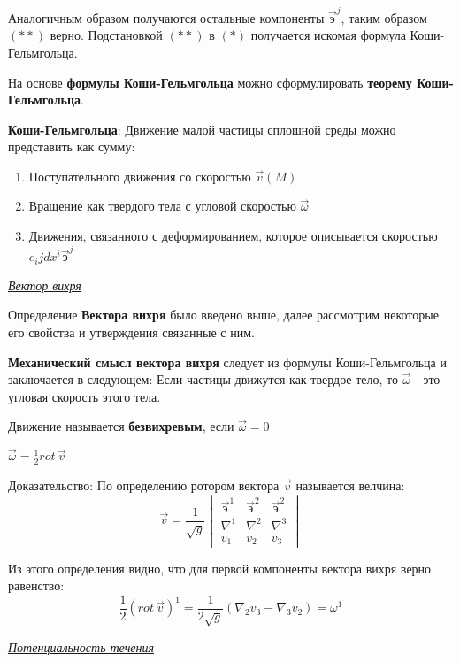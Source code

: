 Аналогичным образом получаются остальные компоненты $\vec{\text{э}}^j$, таким образом $(**)$ верно. Подстановкой $(**)$ в $(*)$ получается искомая формула Коши-Гельмгольца.

На основе \textbf{формулы Коши-Гельмгольца} можно сформулировать \textbf{теорему Коши-Гельмгольца}.

\theorem \textbf{Коши-Гельмгольца}: Движение малой частицы сплошной среды можно представить как сумму:
\begin{enumerate}
	\item Поступательного движения со скоростью $\vec{v}(M)$
	\item Вращение как твердого тела с угловой скоростью $\vec{\omega}$
	\item Движения, связанного с деформированием, которое описывается скоростью $e_ijdx^i \vec{\text{э}}^j$
\end{enumerate}

\begin{center}
	\textit{\underline{Вектор вихря}}
\end{center}

Определение \textbf{Вектора вихря} было введено выше, далее рассмотрим некоторые его свойства и утверждения связанные с ним.

\textbf{Механический смысл вектора вихря} следует из формулы Коши-Гельмгольца и заключается в следующем: Если частицы движутся как твердое тело, то $\vec{\omega}$ - это угловая скорость этого тела. 

 Движение называется \textbf{безвихревым}, если $\vec{\omega} = 0$

\state $\vec{\omega} = \frac{1}{2}rot\, \vec{v}$

Доказательство: По определению ротором вектора $\vec{v}$ называется велчина:
\begin{equation*}
	\vec{v} = \frac{1}{\sqrt{g}}
	\begin{vmatrix}
		\vec{\text{э}}^1 & \vec{\text{э}}^2 & \vec{\text{э}}^2\\
		\nabla^1 & \nabla^2 & \nabla^3\\
		v_1 & v_2 & v_3
	\end{vmatrix}
\end{equation*}

Из этого определения видно, что для первой компоненты вектора вихря верно равенство:
$$
\frac{1}{2}(rot\, \vec{v})^1 = \frac{1}{2 \sqrt{g}} (\nabla_2v_3 - \nabla_3 v_2) = \omega^1
$$

\begin{center}
	\textit{\underline{Потенциальность течения}}
\end{center}


